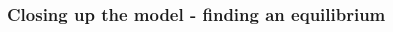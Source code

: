 \documentclass[letterpaper,12pt]{article}
\theoremstyle{definition}
\begin{document}
\begin{spacing}{1.5}
%
%
%
%
%
%
%
%
%
%
%

\subsubsection*{Closing up the model - finding an equilibrium}


\end{spacing}
\end{document}
